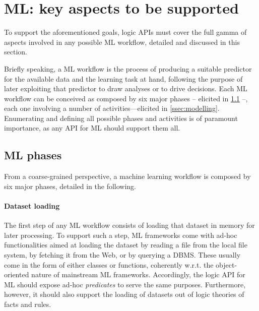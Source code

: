 \documentclass[runningheads]{llncs}
\begin{document}
\section{ML: key aspects to be supported}
\label{sec:requirements}

To support the aforementioned goals, logic APIs must cover the full gamma of aspects involved in any possible ML workflow, detailed and discussed in this section.

Briefly speaking, a ML workflow is the process of producing a suitable predictor for the available data and the learning task at hand, following the purpose of later exploiting that predictor to draw analyses or to drive decisions.
%
Each ML workflow can be conceived as composed by six major phases -- elicited in \cref{ssec:ml-phases} --, each one involving a number of activities---elicited in \cref{ssec:modelling}.
%
Enumerating and defining all possible phases and activities is of paramount importance, as any API for ML should support them all.

\subsection{ML phases}
\label{ssec:ml-phases}

From a coarse-grained perspective, a machine learning workflow is composed by six major phases, detailed in the following.

\paragraph{Dataset loading}
%
The first step of any ML workflow consists of loading that dataset in memory for later processing.
%
To support such a step, ML frameworks come with ad-hoc functionalities aimed at loading the dataset by reading a file from the local file system, by fetching it from the Web, or by querying a DBMS.
%
These usually come in the form of either classes or functions, coherently w.r.t. the object-oriented nature of mainstream ML frameworks.
%
Accordingly, the logic API for ML should expose ad-hoc \emph{predicates} to serve the same purposes.
%
Furthermore, however, it should also support the loading of datasets out of logic theories of facts and rules.
\end{document}
